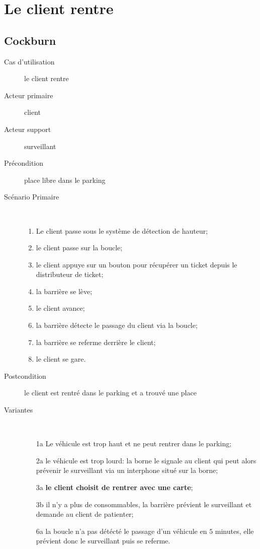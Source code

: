\documentclass[a4paper]{article}
\begin{document}
\newpage

\section{Le client rentre}
\subsection{Cockburn}
\begin{description}
	\item[Cas d'utilisation] le client rentre
	\item[Acteur primaire] client
	\item[Acteur support] surveillant
	\item[Pr\'econdition] place libre dans le parking
	\item[Sc\'enario Primaire] \
	\begin{enumerate}
		\item Le client passe sous le syst\`eme de d\'etection de hauteur;
		\item le client passe sur la boucle;
		\item le client appuye sur un bouton pour r\'ecup\'erer un ticket depuis
			le distributeur de ticket;
		\item la barri\`ere se l\`eve;
		\item le client avance;
		\item la barri\`ere d\'etecte le passage du client via la boucle;
		\item la barri\`ere se referme derri\`ere le client;
		\item le client se gare.
	\end{enumerate}
	\item[Postcondition] le client est rentr\'e dans le parking et a trouv\'e une place
	\item[Variantes] \
	\begin{enumerate}
		\item[1a] Le v\'ehicule est trop haut et ne peut rentrer dans
			le parking;
		\item[2a] le v\'ehicule est trop lourd: la borne le signale au client
			qui peut alors pr\'evenir le surveillant via un interphone situ\'e
			sur la borne;
		\item[3a] \textbf{le client choisit de rentrer avec une carte};
		\item[3b] il n'y a plus de consommables, la barri\`ere pr\'evient
			le surveillant et demande au client de patienter;
		\item[6a] la boucle n'a pas d\'et\'ect\'e le passage d'un v\'ehicule
			en $5$ minutes, elle pr\'evient donc le surveillant puis se referme.
	\end{enumerate}
\end{description}
\end{document}

